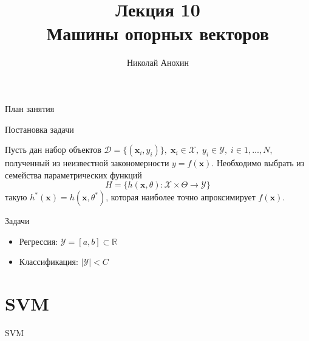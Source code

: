 \documentclass[10pt]{beamer}
\author{Николай Анохин}
\title{\newline \newline \newline Лекция 10 \\ Машины опорных векторов}
\let\otp\titlepage
\renewcommand{\titlepage}{\otp\addtocounter{framenumber}{-1}}
\begin{document}
\begin{frame}[plain]
\titlepage
\end{frame}

\begin{frame}{План занятия}
\tableofcontents
\end{frame}

\begin{frame}{Постановка задачи}

Пусть дан набор объектов $\mathcal{D} = \{(\mathbf{x}_i, y_i)\},
\; \mathbf{x}_i \in \mathcal{X},
\; y_i \in \mathcal{Y},
\; i \in 1, \ldots, N$, полученный из неизвестной закономерности $y = f(\mathbf{x})$. Необходимо выбрать из семейства параметрических функций
\[
H = \{h(\mathbf{x}, \theta): \mathcal{X} \times \Theta \rightarrow \mathcal{Y} \}
\]
такую $h^*(\mathbf{x}) = h(\mathbf{x}, \theta^*)$, которая наиболее точно апроксимирует $f(\mathbf{x})$.

\vspace{1em}
Задачи
\begin{itemize}
\item Регрессия: $\mathcal{Y} = [a, b] \subset \mathbb{R}$
\item Классификация: $|\mathcal{Y}| < C$
\end{itemize}

\end{frame}


\section{SVM}


\begin{frame}{}

\begin{center}
\Large SVM
\end{center}

\end{frame}
\end{document}
